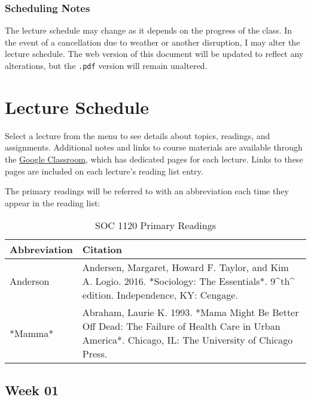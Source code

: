 \documentclass[]{book}
\begin{document}
\hypertarget{scheduling-notes}{%
\subsection{Scheduling Notes}\label{scheduling-notes}}

The lecture schedule may change as it depends on the progress of the class. In the event of a cancellation due to weather or another disruption, I may alter the lecture schedule. The web version of this document will be updated to reflect any alterations, but the \texttt{.pdf} version will remain unaltered.

\hypertarget{lecture-schedule}{%
\chapter{Lecture Schedule}\label{lecture-schedule}}

Select a lecture from the menu to see details about topics, readings, and assignments. Additional notes and links to course materials are available through the \href{https://classroom.google.com}{Google Classroom}, which has dedicated pages for each lecture. Links to these pages are included on each lecture's reading list entry.

The primary readings will be referred to with an abbreviation each time they appear in the reading list:

\begin{table}[t]

\caption{\label{tab:unnamed-chunk-1}SOC 1120 Primary Readings}
\centering
\begin{tabular}{ll}
\toprule
Abbreviation & Citation\\
\midrule
Anderson & Andersen, Margaret, Howard F. Taylor, and Kim A. Logio. 2016. *Sociology: The Essentials*. 9\textasciicircum{}th\textasciicircum{} edition. Independence, KY: Cengage.\\
*Mamma* & Abraham, Laurie K. 1993. *Mama Might Be Better Off Dead: The Failure of Health Care in Urban America*. Chicago, IL: The University of Chicago Press.\\
\bottomrule
\end{tabular}
\end{table}

\hypertarget{week-01}{%
\section*{Week 01}\label{week-01}}
\end{document}
